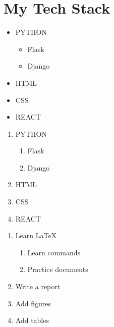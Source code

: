 \documentclass{article}
\begin{document}
	
	\section{My Tech Stack}
	
	\begin{itemize}
		\item PYTHON
		\begin{itemize}
			\item Flask
			\item Django
		\end{itemize}
		\item HTML
		\item CSS
		\item REACT
	\end{itemize}
	
		\begin{enumerate}
		\item PYTHON
		\begin{enumerate}
			\item Flask
			\item Django
		\end{enumerate}
		\item HTML
		\item CSS
		\item REACT
	\end{enumerate}
	
	\begin{enumerate}
		
		\item Learn LaTeX
		
		\begin{enumerate}
			\item Learn commands
			\item Practice documents
		\end{enumerate}
		
		\item Write a report
		\item Add figures
		\item Add tables
		
	\end{enumerate}
	
\end{document}
